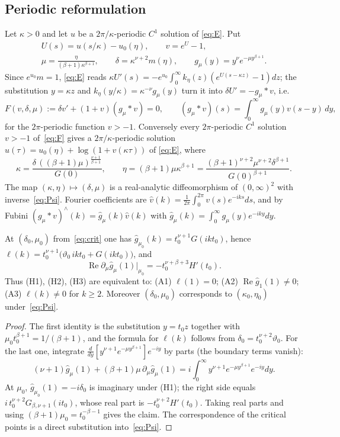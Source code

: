 \documentclass[11pt,a4paper]{report}
\newcommand{\vth}{\vartheta}
\newcommand{\gh}{\hat g}
\begin{document}
\subsection{Periodic reformulation}
Let $\kappa>0$ and let $u$ be a $2\pi/\kappa$-periodic $C^1$ solution of \eqref{eq:E}. Put
\begin{gather*}
U(s)=u(s/\kappa)-u_0(\eta),\qquad v=e^U-1,\\
\mu=\frac{\eta}{(\beta+1)\kappa^{\beta+1}},\qquad
\delta=\kappa^{\nu+2}m(\eta),\qquad g_\mu(y)=y^\nu e^{-\mu y^{\beta+1}}.
\end{gather*}
Since $e^{u_0}m=1$, \eqref{eq:E} reads $\kappa U'(s)=-e^{u_0}\int_0^\infty k_\eta(z)(e^{U(s-\kappa z)}-1)dz$; the substitution $y=\kappa z$ and $k_\eta(y/\kappa)=\kappa^{-\nu}g_\mu(y)$ turn it into $\delta U'=-g_\mu*v$, i.e.
\begin{equation}\label{eq:F}
F(v,\delta,\mu):=\delta v'+(1+v)(g_\mu*v)=0,\qquad (g_\mu*v)(s)=\int_0^\infty g_\mu(y)v(s-y)\,dy,
\end{equation}
for the $2\pi$-periodic function $v>-1$. Conversely every $2\pi$-periodic $C^1$ solution $v>-1$ of~\eqref{eq:F} gives a $2\pi/\kappa$-periodic solution $u(\tau)=u_0(\eta)+\log(1+v(\kappa\tau))$ of \eqref{eq:E}, where
\begin{equation}\label{eq:Psi}
\kappa=\frac{\delta\,((\beta+1)\mu)^{\frac{\nu+1}{\beta+1}}}{G(0)},\qquad
\eta=(\beta+1)\mu\kappa^{\beta+1}=\frac{(\beta+1)^{\nu+2}\mu^{\nu+2}\delta^{\beta+1}}{G(0)^{\beta+1}} .
\end{equation}
The map $(\kappa,\eta)\mapsto(\delta,\mu)$ is a real-analytic diffeomorphism of $(0,\infty)^2$ with inverse~\eqref{eq:Psi}. Fourier coefficients are $\hat v(k)=\frac1{2\pi}\int_0^{2\pi}v(s)e^{-iks}ds$, and by Fubini $(g_\mu*v)^\wedge(k)=\gh_\mu(k)\hat v(k)$ with $\gh_\mu(k)=\int_0^\infty g_\mu(y)e^{-iky}dy$.

\begin{lemma}\label{lem:scaling}
At $(\delta_0,\mu_0)$ from~\eqref{eq:crit} one has $\gh_{\mu_0}(k)=t_0^{\nu+1}G(ikt_0)$, hence $\ell(k)=t_0^{\nu+1}\bigl(\vth_0\,ikt_0+G(ikt_0)\bigr)$, and
\[
\operatorname{Re}\partial_\mu\gh_\mu(1)\big|_{\mu_0}=-t_0^{\nu+\beta+3}H'(t_0).
\]
Thus (H1), (H2), (H3) are equivalent to: (A1) $\ell(1)=0$; (A2) $\operatorname{Re}\gh_1(1)\ne0$; (A3) $\ell(k)\neq0$ for $k\ge2$. Moreover $(\delta_0,\mu_0)$ corresponds to $(\kappa_0,\eta_0)$ under~\eqref{eq:Psi}.
\end{lemma}
\begin{proof}
The first identity is the substitution $y=t_0z$ together with $\mu_0t_0^{\beta+1}=1/(\beta+1)$, and the formula for $\ell(k)$ follows from $\delta_0=t_0^{\nu+2}\vth_0$. For the last one, integrate $\frac{d}{dy}[y^{\nu+1}e^{-\mu y^{\beta+1}}]e^{-iy}$ by parts (the boundary terms vanish):
\[
(\nu+1)\gh_\mu(1)+(\beta+1)\mu\,\partial_\mu\gh_\mu(1)=i\int_0^\infty y^{\nu+1}e^{-\mu y^{\beta+1}}e^{-iy}dy .
\]
At $\mu_0$, $\gh_{\mu_0}(1)=-i\delta_0$ is imaginary under (H1); the right side equals $i\,t_0^{\nu+2}G_{\beta,\nu+1}(it_0)$, whose real part is $-t_0^{\nu+2}H'(t_0)$. Taking real parts and using $(\beta+1)\mu_0=t_0^{-\beta-1}$ gives the claim. The correspondence of the critical points is a direct substitution into~\eqref{eq:Psi}.
\end{proof}
\end{document}
